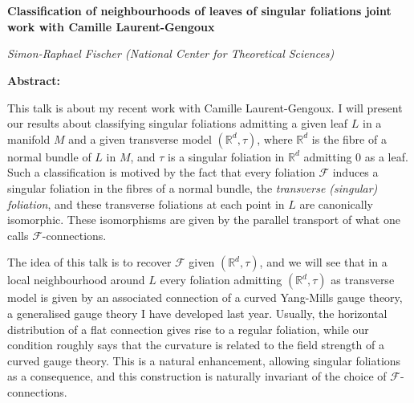 \documentclass[12pt, a4paper]{amsart}
\newcommand{\red}{\color[rgb]{0.8,0,0}}
\newcommand{\green}{\color[rgb]{0.1,0.6,0.1}}
\newcommand{\blue}{\color[rgb]{0.1,0.1,0.7}}
\begin{document}
\noindent{\Large \bf \green NCTS 2023 Postdoc Symposium}\\       %
\\
\noindent
{\large \bf \blue Classification of neighbourhoods of leaves of singular foliations \newline \normalsize joint work with Camille Laurent-Gengoux
}

\noindent
{\large \it \red Simon-Raphael Fischer (National Center for Theoretical Sciences)}

\noindent
{\bf Abstract:}\\
{
This talk is about my recent work with Camille Laurent-Gengoux. I will present our results about classifying singular foliations admitting a given leaf $L$ in a manifold $M$ and a given transverse model $(\mathbb{R}^d, \tau)$, where $\mathbb{R}^d$ is the fibre of a normal bundle of $L$ in $M$, and $\tau$ is a singular foliation in $\mathbb{R}^d$ admitting 0 as a leaf. Such a classification is motived by the fact that every foliation $\mathcal{F}$ induces a singular foliation in the fibres of a normal bundle, the \emph{transverse (singular) foliation}, and these transverse foliations at each point in $L$ are canonically isomorphic. These isomorphisms are given by the parallel transport of what one calls $\mathcal{F}$-connections.

The idea of this talk is to recover $\mathcal{F}$ given $(\mathbb{R}^d, \tau)$, and we will see that in a local neighbourhood around $L$ every foliation admitting $(\mathbb{R}^d, \tau)$ as transverse model is given by an associated connection of a curved Yang-Mills gauge theory, a generalised gauge theory I have developed last year. Usually, the horizontal distribution of a flat connection gives rise to a regular foliation, while our condition roughly says that the curvature is related to the field strength of a curved gauge theory. This is a natural enhancement, allowing singular foliations as a consequence, and this construction is naturally invariant of the choice of $\mathcal{F}$-connections.
}\\
\end{document}
